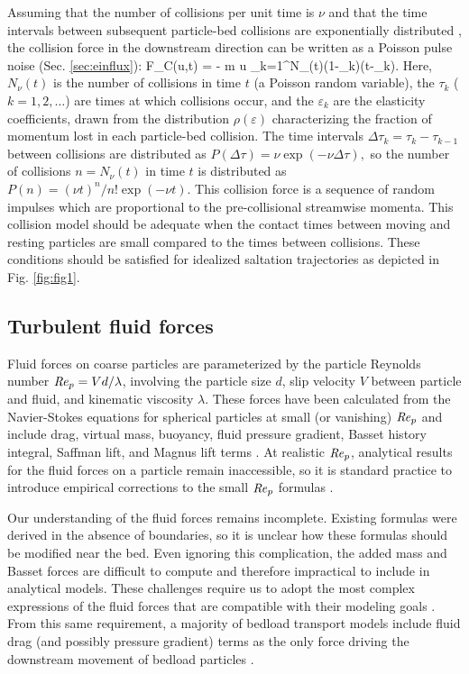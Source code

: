 Assuming that the number of collisions per unit time is $\nu$ and that the time intervals between subsequent particle-bed collisions are exponentially distributed \citep[e.g.][]{Gordon1972}, the collision force in the downstream direction can be written as a Poisson pulse noise (Sec. \ref{sec:einflux}):
\be F_C(u,t) = - m u \sum_{k=1}^{N_\nu(t)}(1-\varepsilon_k)\delta(t-\tau_k). \label{eq:col} \ee
Here, $N_\nu(t)$ is the number of collisions in time $t$ (a Poisson random variable), the $\tau_k$ ($k=1,2,\dots$) are times at which collisions occur, and the $\varepsilon_k$ are the elasticity coefficients, drawn from the distribution $\rho(\varepsilon)$ characterizing the fraction of momentum lost in each particle-bed collision.
The time intervals $\Delta \tau_k = \tau_k-\tau_{k-1}$ between collisions are distributed as $P(\Delta \tau) = \nu \exp(-\nu\Delta \tau),$ so the number of collisions $n=N_\nu(t)$ in time $t$ is distributed as $P(n) = (\nu t)^n/n! \exp(-\nu t).$
This collision force is a sequence of random impulses which are proportional to the pre-collisional streamwise momenta. This collision model should be adequate when the contact times between moving and resting particles are small compared to the times between collisions. These conditions should be satisfied for idealized saltation trajectories as depicted in Fig. \ref{fig:fig1}.

\subsection{Turbulent fluid forces}

Fluid forces on coarse particles are parameterized by the particle Reynolds number $\mbox{\textit{Re}}_p = V d/\lambda$, involving the particle size $d$, slip velocity $V$ between particle and fluid, and kinematic viscosity $\lambda$.
These forces have been calculated from the Navier-Stokes equations for spherical particles at small (or vanishing) $\mbox{\textit{Re}}_p$ and include drag, virtual mass, buoyancy, fluid pressure gradient, Basset history integral, Saffman lift, and Magnus lift terms \citep{Hjelmfelt1966, Maxey1983, Auton1987}.
At realistic $\mbox{\textit{Re}}_p$, analytical results for the fluid forces on a particle remain inaccessible, so it is standard practice to introduce empirical corrections to the small $\mbox{\textit{Re}}_p$ formulas \citep[e.g.][]{Clift1978,Schmeeckle2007}.

Our understanding of the fluid forces remains incomplete.
Existing formulas were derived in the absence of boundaries, so it is unclear how these formulas should be modified near the bed.
Even ignoring this complication, the added mass and Basset forces are difficult to compute and therefore impractical to include in analytical models.
These challenges require us to adopt the most complex expressions of the fluid forces that are compatible with their modeling goals \citep[e.g.][]{Michaelides1997,Armenio2001}.
From this same requirement, a majority of bedload transport models include fluid drag (and possibly pressure gradient) terms as the only force driving the downstream movement of bedload particles \citep{Ancey2014,Fan2014,Schmeeckle2014,Gonzalez2017,Elghannay2017}.

